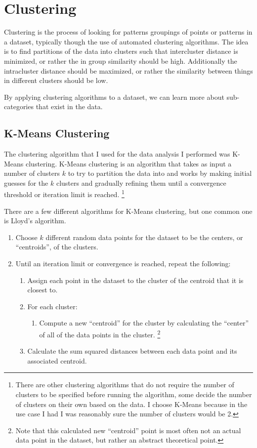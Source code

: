 \documentclass[]{article}
\begin{document}
\section{Clustering}

Clustering is the process of looking for patterns groupings of points or patterns in a dataset, typically though the use of automated clustering algorithms. The idea is to find partitions of the data into clusters such that intercluster distance is minimized, or rather the in group similarity should be high. Additionally the intracluster distance should be maximized, or rather the similarity between things in different clusters should be low. \cite{jain_2010}

By applying clustering algorithms to a dataset, we can learn more about sub-categories that exist in the data. \cite{jain_2010}

\subsection{K-Means Clustering}

The clustering algorithm that I used for the data analysis I performed was K-Means clustering. K-Means clustering is an algorithm that takes as input a number of clusters $k$ to try to partition the data into and works by making initial guesses for the $k$ clusters and gradually refining them until a convergence threshold or iteration limit is reached. \footnote{There are other clustering algorithms that do not require the number of clusters to be specified before running the algorithm, some decide the number of clusters on their own based on the data. I choose K-Means because in the use case I had I was reasonably sure the number of clusters would be 2.} \cite{jain_2010}

There are a few different algorithms for K-Means clustering, but one common one is Lloyd’s algorithm. \cite{arthur_2007}

\begin{enumerate}
	\item Choose $k$ different random data points for the dataset to be the centers, or ``centroids'', of the clusters.
	\item Until an iteration limit or convergence is reached, repeat the following:
	\begin{enumerate}
		\item Assign each point in the dataset to the cluster of the centroid that it is closest to.
		\item For each cluster:
		\begin{enumerate}
			\item Compute a new ``centroid'' for the cluster by calculating the ``center'' of all of the data points in the cluster. \footnote{Note that this calculated new ``centroid'' point is most often not an actual data point in the dataset, but rather an abstract theoretical point.}
		\end{enumerate}
		\item Calculate the sum squared distances between each data point and its associated centroid.
	\end{enumerate}
\end{enumerate}
\end{document}
